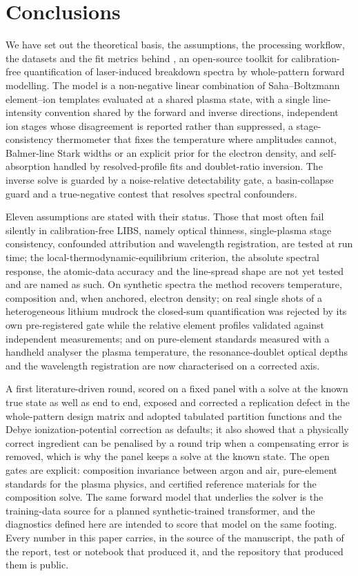 \section{Conclusions}
\label{sec:conclusions}

We have set out the theoretical basis, the assumptions, the processing workflow,
the datasets and the fit metrics behind \alibz, an open-source toolkit for
calibration-free quantification of laser-induced breakdown spectra by
whole-pattern forward modelling. The model is a non-negative linear combination
of Saha--Boltzmann element--ion templates evaluated at a shared plasma state, with
a single line-intensity convention shared by the forward and inverse directions,
independent ion stages whose disagreement is reported rather than suppressed, a
stage-consistency thermometer that fixes the temperature where amplitudes cannot,
Balmer-line Stark widths or an explicit prior for the electron density, and
self-absorption handled by resolved-profile fits and doublet-ratio inversion. The
inverse solve is guarded by a noise-relative detectability gate, a basin-collapse
guard and a true-negative contest that resolves spectral confounders.

Eleven assumptions are stated with their status. Those that most often fail
silently in calibration-free LIBS, namely optical thinness, single-plasma stage
consistency, confounded attribution and wavelength registration, are tested at
run time; the local-thermodynamic-equilibrium criterion, the absolute spectral
response, the atomic-data accuracy and the line-spread shape are not yet tested
and are named as such. On synthetic spectra the method recovers temperature,
composition and, when anchored, electron density; on real single shots of a
heterogeneous lithium mudrock the closed-sum quantification was rejected by its
own pre-registered gate while the relative element profiles validated against
independent measurements; and on pure-element standards measured with a handheld
analyser the plasma temperature, the resonance-doublet optical depths and the
wavelength registration are now characterised on a corrected axis.

A first literature-driven round, scored on a fixed panel with a solve at the known true state as
well as end to end, exposed and corrected a replication defect in the whole-pattern design matrix
and adopted tabulated partition functions and the Debye ionization-potential correction as
defaults; it also showed that a physically correct ingredient can be penalised by a round trip when
a compensating error is removed, which is why the panel keeps a solve at the known state.
The open gates are explicit: composition invariance between argon and air,
pure-element standards for the plasma physics, and certified reference materials
for the composition solve. The same forward model that underlies the solver is the
training-data source for a planned synthetic-trained transformer, and the
diagnostics defined here are intended to score that model on the same footing.
Every number in this paper carries, in the source of the manuscript, the path of
the report, test or notebook that produced it, and the repository that produced
them is public.
